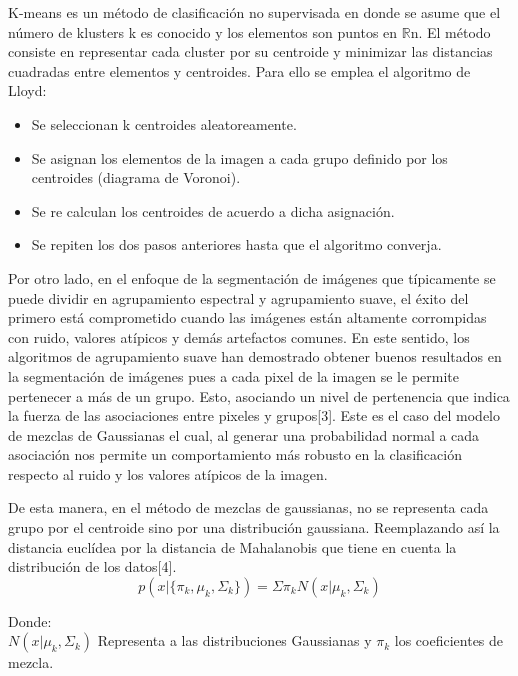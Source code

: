 \documentclass[10pt,twocolumn,letterpaper]{article}
\begin{document}
K-means es un método de clasificación no supervisada en donde se asume que el número de klusters k es conocido y los elementos son puntos en $\mathbb{R}$n. El método consiste en representar cada cluster por su centroide y minimizar las distancias cuadradas entre elementos y centroides. Para ello se emplea el algoritmo de Lloyd:

\begin{itemize}
\item Se seleccionan k centroides aleatoreamente.
\item Se asignan los elementos de la imagen a cada grupo definido por los centroides (diagrama de Voronoi).
\item Se re calculan los centroides de acuerdo a dicha asignación.
\item Se repiten los dos pasos anteriores hasta que el algoritmo converja.
\end{itemize}

Por otro lado, en el enfoque de la segmentación de imágenes que típicamente se puede dividir en agrupamiento espectral y agrupamiento suave, el éxito del primero está comprometido cuando las imágenes están altamente corrompidas con ruido, valores atípicos y demás artefactos comunes. En este sentido, los algoritmos de agrupamiento suave han demostrado obtener buenos resultados en la segmentación de imágenes pues a cada pixel de la imagen se le permite pertenecer a más de un grupo. Esto, asociando un nivel de pertenencia que indica la fuerza de las asociaciones entre pixeles y grupos[3]. Este es el caso del modelo de mezclas de Gaussianas el cual, al generar una probabilidad normal a cada asociación nos permite un comportamiento más robusto en la clasificación respecto al ruido y los valores atípicos de la imagen.

De esta manera, en el método de mezclas de gaussianas, no se representa cada grupo por el centroide sino por una distribución gaussiana. Reemplazando así la distancia euclídea por la distancia de Mahalanobis que tiene en cuenta la distribución de los datos[4].
\begin{equation}
p (x|\{\pi_k,\mu_k,\Sigma_k\})=\Sigma \pi_k N (x|\mu_k,\Sigma_k)
\end{equation}

Donde:\\

$N (x|\mu_k,\Sigma_k)$ Representa a las distribuciones Gaussianas y $\pi_k$ los coeficientes de mezcla.\\
\end{document}
